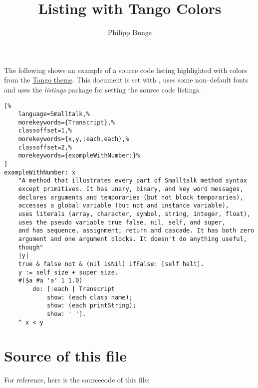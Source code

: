 \documentclass[a4paper, 11pt]{scrartcl}
\begin{document}
\title{Listing with Tango Colors}
\author{Philipp Bunge}
\date{}

\maketitle

\setlength{\parskip}{1em}
\setlength{\parindent}{0pt}



The following shows an example of a source code listing highlighted with colors from the \href{http://tango.freedesktop.org/}{Tango theme}. This document is set with \XeLaTeX, uses some non–default fonts and uses the \emph{listings} package for setting the source code listings.


\vspace{4em}

\begin{lstlisting}[%
	language=Smalltalk,%
	morekeywords={Transcript},%
	classoffset=1,%
	morekeywords={x,y,:each,each},%
	classoffset=2,%
	morekeywords={exampleWithNumber:}%
]
exampleWithNumber: x
	"A method that illustrates every part of Smalltalk method syntax
	except primitives. It has unary, binary, and key word messages,
	declares arguments and temporaries (but not block temporaries),
	accesses a global variable (but not and instance variable),
	uses literals (array, character, symbol, string, integer, float),
	uses the pseudo variable true false, nil, self, and super,
	and has sequence, assignment, return and cascade. It has both zero
	argument and one argument blocks. It doesn't do anything useful,
	though"
	|y|
	true & false not & (nil isNil) ifFalse: [self halt].
	y := self size + super size.
	#($a #a 'a' 1 1.0)
		do: [:each | Transcript
			show: (each class name);
			show: (each printString);
			show: ' '].
	^ x < y
\end{lstlisting}

\newpage
\section*{Source of this file}

For reference, here is the sourcecode of this file:


\end{document}
